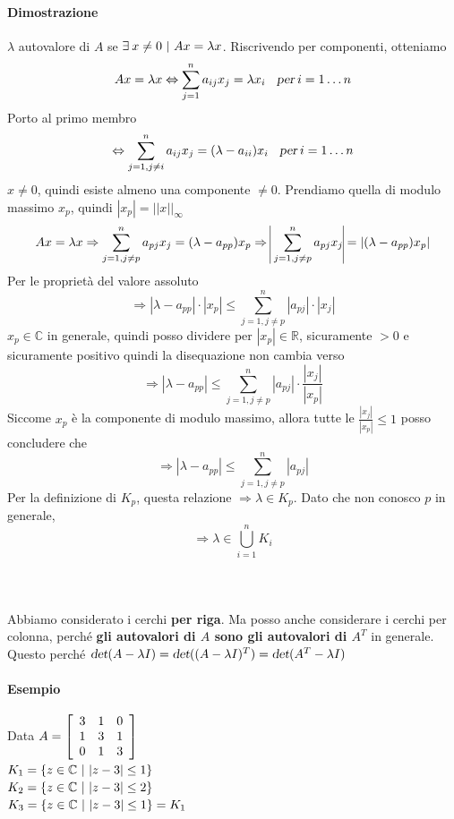 \documentclass[10pt]{book}
\begin{document}
\paragraph{Dimostrazione} $\lambda$ autovalore di $A$ se $\exists\:x \neq 0 \:\:\vline\:\: Ax = \lambda x$. Riscrivendo per componenti, otteniamo
$$Ax = \lambda x \Leftrightarrow \sum_{j = 1}^n a_{ij}x_j = \lambda x_i\:\:\:\:\textsl{per}\:i = 1\ldots n$$
Porto al primo membro
$$\Leftrightarrow  \sum_{j = 1, j \neq i}^n a_{ij}x_j = (\lambda - a_{ii})x_i\:\:\:\:\textsl{per}\:i = 1\ldots n$$
$x \neq 0$, quindi esiste almeno una componente $\neq 0$. Prendiamo quella di modulo massimo $x_p$, quindi $|x_p| = ||x||_\infty$
$$Ax = \lambda x \Rightarrow \sum_{j = 1, j \neq p}^n a_{pj}x_j = (\lambda - a_{pp})x_p \Rightarrow\:\vline\sum_{j = 1, j \neq p}^n a_{pj}x_j\vline = |(\lambda - a_{pp})x_p|$$
Per le proprietà del valore assoluto
$$\Rightarrow |\lambda - a_{pp}|\cdot|x_p| \leq \sum_{j = 1, j \neq p}^n |a_{pj}|\cdot |x_j| $$
$x_p \in \mathbb{C}$ in generale, quindi posso dividere per $|x_p| \in \mathbb{R}$, sicuramente $> 0$ e sicuramente positivo quindi la disequazione non cambia verso
$$\Rightarrow |\lambda - a_{pp}| \leq \sum_{j = 1, j \neq p}^n |a_{pj}|\cdot \frac{|x_j|}{|x_p|} $$
Siccome $x_p$ è la componente di modulo massimo, allora tutte le $\frac{|x_j|}{|x_p|} \leq 1$ posso concludere che
$$\Rightarrow |\lambda - a_{pp}| \leq \sum_{j = 1, j \neq p}^n |a_{pj}|$$
Per la definizione di $K_p$, questa relazione $\Rightarrow \lambda \in K_p$. Dato che non conosco $p$ in generale, $$\Rightarrow \lambda \in \bigcup_{i = 1}^n K_i$$\\\\\\
Abbiamo considerato i cerchi \textbf{per riga}. Ma posso anche considerare i cerchi per colonna, perché \textbf{gli autovalori di $A$ sono gli autovalori di $A^T$} in generale.\\
Questo perché $\textsl{det}(A - \lambda I) = \textsl{det}((A - \lambda I)^T) = \textsl{det}(A^T - \lambda I)$
\paragraph{Esempio} Data \begin{math}
A = \left[ 
	\begin{array}{c c c}
		3 & 1 & 0\\
		1 & 3 & 1\\
		0 & 1 & 3
	\end{array}
	\right]
\end{math}\\
$K_1 = \left\{ z \in \mathbb{C} \:\:\vline\:\: |z - 3| \leq 1\right\}$\\
$K_2 = \left\{ z \in \mathbb{C} \:\:\vline\:\: |z - 3| \leq 2\right\}$\\
$K_3 = \left\{ z \in \mathbb{C} \:\:\vline\:\: |z - 3| \leq 1\right\} = K_1$
\end{document}
